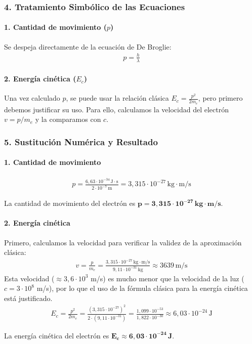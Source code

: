\subsubsection*{4. Tratamiento Simbólico de las Ecuaciones}
\paragraph{1. Cantidad de movimiento ($p$)}
Se despeja directamente de la ecuación de De Broglie:
\begin{gather}
    p = \frac{h}{\lambda}
\end{gather}
\paragraph{2. Energía cinética ($E_c$)}
Una vez calculado $p$, se puede usar la relación clásica $E_c = \frac{p^2}{2m_e}$, pero primero debemos justificar su uso. Para ello, calculamos la velocidad del electrón $v = p/m_e$ y la comparamos con $c$.

\subsubsection*{5. Sustitución Numérica y Resultado}
\paragraph{1. Cantidad de movimiento}
\begin{gather}
    p = \frac{6,63 \cdot 10^{-34} \, \text{J}\cdot\text{s}}{2 \cdot 10^{-7} \, \text{m}} = 3,315 \cdot 10^{-27} \, \text{kg}\cdot\text{m/s}
\end{gather}
\begin{cajaresultado}
    La cantidad de movimiento del electrón es $\boldsymbol{p = 3,315 \cdot 10^{-27} \, \textbf{kg}\cdot\textbf{m/s}}$.
\end{cajaresultado}

\paragraph{2. Energía cinética}
Primero, calculamos la velocidad para verificar la validez de la aproximación clásica:
\begin{gather}
    v = \frac{p}{m_e} = \frac{3,315 \cdot 10^{-27} \, \text{kg}\cdot\text{m/s}}{9,11 \cdot 10^{-31} \, \text{kg}} \approx 3639 \, \text{m/s}
\end{gather}
Esta velocidad ($ \approx 3,6 \cdot 10^3$ m/s) es mucho menor que la velocidad de la luz ($c=3 \cdot 10^8$ m/s), por lo que el uso de la fórmula clásica para la energía cinética está justificado.
\begin{gather}
    E_c = \frac{p^2}{2m_e} = \frac{(3,315 \cdot 10^{-27})^2}{2 \cdot (9,11 \cdot 10^{-31})} = \frac{1,099 \cdot 10^{-53}}{1,822 \cdot 10^{-30}} \approx 6,03 \cdot 10^{-24} \, \text{J}
\end{gather}
\begin{cajaresultado}
    La energía cinética del electrón es $\boldsymbol{E_c \approx 6,03 \cdot 10^{-24} \, \textbf{J}}$.
\end{cajaresultado}

